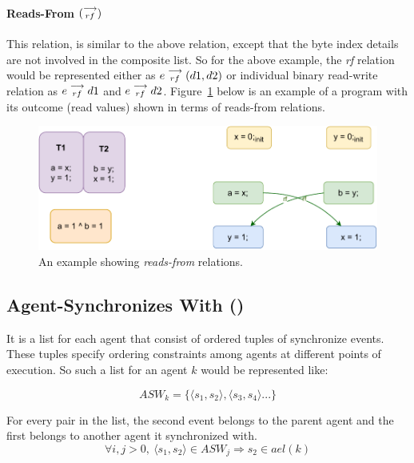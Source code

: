             \paragraph{Reads-From $(\stackrel{\longrightarrow}{_{rf}})$}
            This relation, is similar to the above relation, except that the byte index details are not involved in the composite list. So for the above example, the \textit{rf} relation would be represented either as   
                $e\stackrel{\longrightarrow}{_{rf}}(d1, d2)$
            or individual binary read-write relation as 
                $e\stackrel{\longrightarrow}{_{rf}}d1$ and $e\stackrel{\longrightarrow}{_{rf}}d2$.
            Figure~\ref{model:read-from} below is an example of a program with its outcome (read values) shown in terms of reads-from relations. 
            \begin{figure}[H]
                \centering
                \includegraphics[scale=0.7]{4.ECMAScriptMemoryModel/ReadsFrom.pdf}
                \caption{An example showing \textit{reads-from} relations.}
                \label{model:read-from}
            \end{figure}
            
        \subsection{Agent-Synchronizes With ()}
        
            It is a list for each agent that consist of ordered tuples of synchronize events. 
            These tuples specify ordering constraints among agents at different points of execution. 
            So such a list for an agent $k$ would be represented like:  

                \[ASW_k = \{ \langle s_1, s_2 \rangle, \langle s_3, s_4 \rangle ...\}\]
        
            For every pair in the list, the second event belongs to the parent agent and the first belongs to another agent it synchronized with\footnotemark.
                \[  
                    \forall{i,j>0},\ 
                    \langle s_1, s_2 \rangle \in ASW_j 
                    \Rightarrow{} 
                    s_2 \in ael(k)                        
                \]


